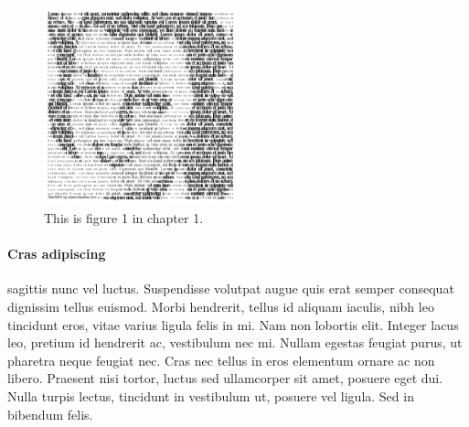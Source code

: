 \begin{figure}[]
\begin{center}
\includegraphics[width=0.5\textwidth]{01x01}
\end{center}
\caption{This is figure 1 in chapter 1.}
\end{figure}

\paragraph{Cras adipiscing} sagittis nunc vel luctus. Suspendisse volutpat augue quis erat semper consequat dignissim tellus euismod. Morbi hendrerit, tellus id aliquam iaculis, nibh leo tincidunt eros, vitae varius ligula felis in mi.
Nam non lobortis elit. Integer lacus leo, pretium id hendrerit ac, vestibulum nec mi. Nullam egestas feugiat purus, ut pharetra neque feugiat nec. Cras nec tellus in eros elementum ornare ac non libero. Praesent nisi tortor, luctus sed ullamcorper sit amet, posuere eget dui. Nulla turpis lectus, tincidunt in vestibulum ut, posuere vel ligula. Sed in bibendum felis. 

